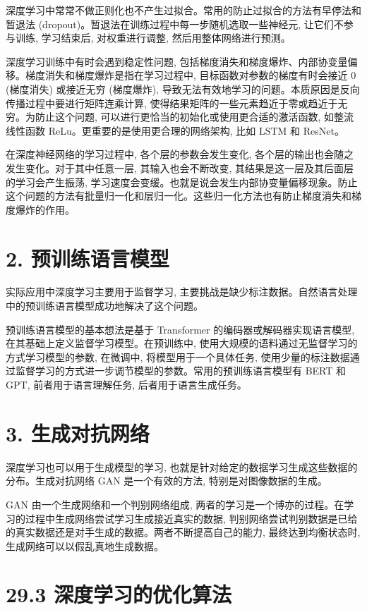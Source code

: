\documentclass[10pt]{article}
\begin{document}
深度学习中常常不做正则化也不产生过拟合。常用的防止过拟合的方法有早停法和暂退法 (dropout)。暂退法在训练过程中每一步随机选取一些神经元, 让它们不参与训练, 学习结束后, 对权重进行调整, 然后用整体网络进行预测。

深度学习训练中有时会遇到稳定性问题, 包括梯度消失和梯度爆炸、内部协变量偏移。梯度消失和梯度爆炸是指在学习过程中, 目标函数对参数的梯度有时会接近 0 (梯度消失) 或接近无穷 (梯度爆炸), 导致无法有效地学习的问题。本质原因是反向传播过程中要进行矩阵连乘计算, 使得结果矩阵的一些元素趋近于零或趋近于无穷。为防止这个问题, 可以进行更恰当的初始化或使用更合适的激活函数, 如整流线性函数 ReLu。更重要的是使用更合理的网络架构, 比如 LSTM 和 ResNet。

在深度神经网络的学习过程中, 各个层的参数会发生变化, 各个层的输出也会随之发生变化。对于其中任意一层, 其输入也会不断改变, 其结果是这一层及其后面层的学习会产生振荡, 学习速度会变缓。也就是说会发生内部协变量偏移现象。防止这个问题的方法有批量归一化和层归一化。这些归一化方法也有防止梯度消失和梯度爆炸的作用。

\section*{2. 预训练语言模型}
实际应用中深度学习主要用于监督学习, 主要挑战是缺少标注数据。自然语言处理中的预训练语言模型成功地解决了这个问题。

预训练语言模型的基本想法是基于 Transformer 的编码器或解码器实现语言模型, 在其基础上定义监督学习模型。在预训练中, 使用大规模的语料通过无监督学习的方式学习模型的参数, 在微调中, 将模型用于一个具体任务, 使用少量的标注数据通过监督学习的方式进一步调节模型的参数。常用的预训练语言模型有 BERT 和 GPT, 前者用于语言理解任务, 后者用于语言生成任务。

\section*{3. 生成对抗网络}
深度学习也可以用于生成模型的学习, 也就是针对给定的数据学习生成这些数据的分布。生成对抗网络 GAN 是一个有效的方法, 特别是对图像数据的生成。

GAN 由一个生成网络和一个判别网络组成, 两者的学习是一个博亦的过程。在学习的过程中生成网络尝试学习生成接近真实的数据, 判别网络尝试判别数据是已给的真实数据还是对手生成的数据。两者不断提高自己的能力, 最终达到均衡状态时, 生成网络可以以假乱真地生成数据。

\section*{29.3 深度学习的优化算法}
\end{document}
